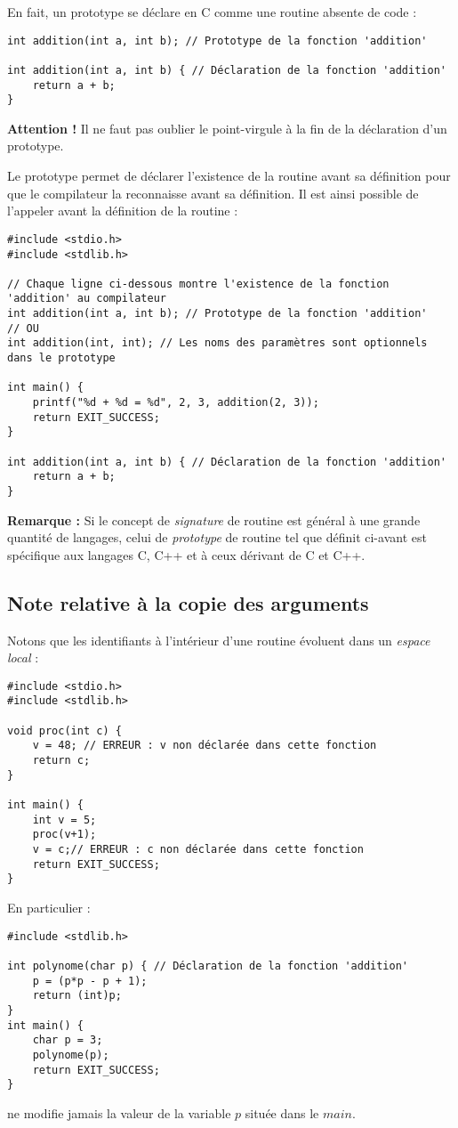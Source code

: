 \documentclass[../../../main.tex]{subfiles}
\begin{document}
En fait, un prototype se déclare en C comme une routine absente de code :
\begin{verbatim}
int addition(int a, int b); // Prototype de la fonction 'addition'

int addition(int a, int b) { // Déclaration de la fonction 'addition'
	return a + b;
}
\end{verbatim}
\textbf{Attention !} Il ne faut pas oublier le point-virgule à la fin de la déclaration d'un prototype.

Le prototype permet de déclarer l'existence de la routine avant sa définition pour que le compilateur la reconnaisse avant sa définition. Il est ainsi possible de l'appeler avant la définition de la routine :
\begin{verbatim}
#include <stdio.h>
#include <stdlib.h>

// Chaque ligne ci-dessous montre l'existence de la fonction 'addition' au compilateur
int addition(int a, int b); // Prototype de la fonction 'addition'
// OU
int addition(int, int); // Les noms des paramètres sont optionnels dans le prototype

int main() {
	printf("%d + %d = %d", 2, 3, addition(2, 3));
	return EXIT_SUCCESS;
}

int addition(int a, int b) { // Déclaration de la fonction 'addition'
	return a + b;
}
\end{verbatim}
 
\textbf{Remarque :} Si le concept de \textit{signature} de routine est général à une grande quantité de langages, celui de \textit{prototype} de routine tel que définit ci-avant est spécifique aux langages C, C++ et à ceux dérivant de C et C++.
\subsection{Note relative à la copie des arguments}
Notons que les identifiants à l'intérieur d'une routine évoluent dans un \textit{espace local} :
\begin{verbatim}
#include <stdio.h>
#include <stdlib.h>

void proc(int c) {
	v = 48; // ERREUR : v non déclarée dans cette fonction
	return c;
}

int main() {
	int v = 5;
	proc(v+1);
	v = c;// ERREUR : c non déclarée dans cette fonction
	return EXIT_SUCCESS;
}
\end{verbatim}
En particulier :
\begin{verbatim}
#include <stdlib.h>

int polynome(char p) { // Déclaration de la fonction 'addition'
	p = (p*p - p + 1);
	return (int)p;
}
int main() {
	char p = 3;
	polynome(p);
	return EXIT_SUCCESS;
}
\end{verbatim}
ne modifie jamais la valeur de la variable $p$ située dans le $main$.
 
\end{document}
